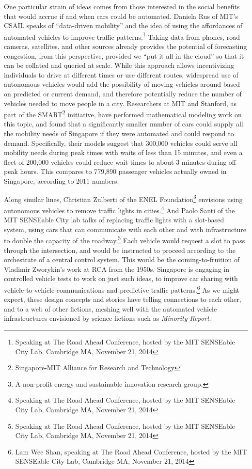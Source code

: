 One particular strain of ideas comes from those interested in the
social benefits that would accrue if and when cars could be automated.
Daniela Rus of MIT's CSAIL speaks of ``data-driven mobility'' and the
idea of using the affordances of automated vehicles to improve traffic
patterns.\footnote{Speaking at The Road Ahead Conference, hosted by
  the MIT SENSEable City Lab, Cambridge MA, November 21, 2014} Taking
data from phones, road cameras, satellites, and other 
sources already provides the potential of forecasting congestion, from
this perspective,
provided we ``put it all in the cloud'' so that it can be collated and
queried at scale. While this approach allows incentivizing individuals to drive at
different times or use different routes, widespread use of autonomous vehicles would add
the possibility of moving vehicles around based on predicted or
current demand, and therefore potentially reduce the number of
vehicles needed to move people in a city. Researchers at MIT and Stanford, as part of the
SMART\footnote{Singapore-MIT Alliance for Research and Technology} initiative, have
performed mathematical modeling work on this topic, and found that a
significantly smaller number of cars could supply all the mobility
needs of Singapore if they were automated and could respond to demand.
Specifically, their models suggest that 300,000 vehicles could serve
all mobility needs during peak times with waits of less than 15
minutes, and even a fleet of 200,000 vehicles could reduce wait times
to about 3 minutes during off-peak hours.\cite{frazzoliSingapore} This
compares to 779,890 passenger vehicles actually owned in Singapore,
according to 2011 numbers.

Along similar
lines, Christian Zulberti of the ENEL Foundation\footnote{A non-profit
  energy and sustainable innovation research group.} envisions using
autonomous vehicles to remove traffic lights in
cities.\footnote{Speaking at The Road Ahead Conference, hosted by
  the MIT SENSEable City Lab, Cambridge MA, November 21, 2014} And Paolo
Santi of the MIT SENSEable City lab talks of replacing traffic lights
with a slot-based system, using cars that can communicate with each
other and with infrastructure to double the capacity of the
roadway.\footnote{Speaking at The Road Ahead Conference, hosted by
  the MIT SENSEable City Lab, Cambridge MA, November 21, 2014} Each vehicle would request a slot to pass through the
intersection, and would be instructed to proceed according to the
orchestrate of a central control system. This would be the coming-to-fruition of
Vladimir Zworykin's work at RCA from the 1950s. Singapore is engaging in
controlled vehicle tests to work on just such ideas, to improve car
sharing with vehicle-to-vehicle communications and predictive traffic
patterns.\footnote{Lam Wee Shan, speaking at The Road Ahead Conference, hosted by
  the MIT SENSEable City Lab, Cambridge MA, November 21, 2014} As we
might expect, these
design concepts and stories have telling connections to each other, and
to a web of other fictions, meshing well with the automated vehicle
infrastructures envisioned by science fictions such as \emph{Minority Report}.

